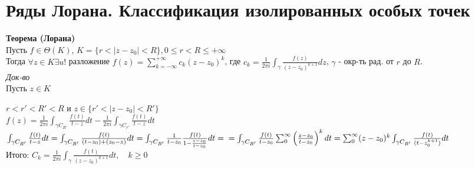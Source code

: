 \section{Ряды Лорана. Классификация изолированных особых точек}
\textbf{Теорема (Лорана)}\\
Пусть $f\in \Theta(K)$, $K=\{r<|z-z_0|<R\}, 0\leq r <R\leq +\infty$\\
Тогда $\forall z\in K \exists u!$ разложение
$f(z)=\sum_{k=-\infty}^{+\infty}c_k(z-z_0)^k$, где
$c_k=\frac{1}{2\pi i }\int_{\gamma}\frac{f(z)}{(z-z_0)^{k+1}}dz$,
$\gamma$ - окр-ть рад. от $r$ до $R$.\\
\textit{Док-во}\\
Пусть $z\in K$
\begin{figure}[H]
\end{figure}
$r<r'<R'<R$ и $z\in\{r'<|z-z_0|<R'\}$\\
$f(z)=\frac{1}{2\pi i }\int_{\gamma C_{R'}}\frac{f(t)}{t-z}dt-\frac{1}{2\pi i }\int_{\gamma C_{r'}}\frac{f(t)}{t-z}dt$
$\int_{\gamma C_{R'}}\frac{f(t)}{t-z}dt=\int_{\gamma C_{R'}}\frac{f(t)}{(t-z_0)+(z_0-z)}dt=
\int_{\gamma C_{R'}}\frac{1}{t-z_0}\frac{f(t)}{1-\frac{z-z_0}{t-z_0}}dt=\\
=\int_{\gamma C_{R'}}\frac{f(t)}{t-z_0}\sum_{0}^{\infty}\left( \frac{z-z_0}{t-z_0} \right)^k dt=
\sum_{0}^{\infty} (z-z_0)^k\int_{\gamma C_{R'}}\frac{f(t)}{(t-z_0^{k+1})}dt$\\
Итого: $C_k=\frac{1}{2\pi i}\int_{\gamma}\frac{f(t)}{(z-z_0)^{k+1}}dt,\quad k\geq0$